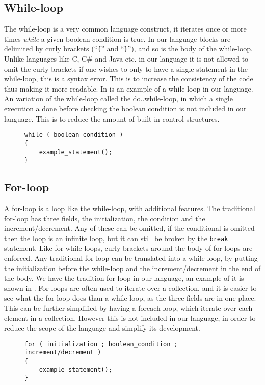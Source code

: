 \subsection{While-loop}
The while-loop is a very common language construct, it iterates once or more times \textit{while} a given boolean condition is true. 
In our language blocks are delimited by curly brackets (``\texttt{\{}'' and ``\texttt{\}}''), and so is the body of the while-loop. 
Unlike languages like C, C\# and Java etc. in our language it is not allowed to omit the curly brackets if one wishes to only to have a single statement in the while-loop, this is a syntax error. 
This is to increase the consistency of the code thus making it more readable. 
In  is an example of a while-loop in our language. 
An variation of the while-loop called the do..while-loop, in which a single execution a done before checking the boolean condition is not included in our language. 
This is to reduce the amount of built-in control structures. 

\begin{figure}[h]
\begin{lstlisting}[caption=An example of a while-loop, label=lst:whileExample]
while ( boolean_condition )
{
    example_statement();
}
\end{lstlisting}
\end{figure}
\subsection{For-loop}
A for-loop is a loop like the while-loop, with additional features. 
The traditional for-loop has three fields, the initialization, the condition and the increment/decrement. 
Any of these can be omitted, if the conditional is omitted then the loop is an infinite loop, but it can still be broken by the \texttt{break} statement.
Like for while-loops, curly brackets around the body of for-loops are enforced. 
Any traditional for-loop can be translated into a while-loop, by putting the initialization before the while-loop and the increment/decrement in the end of the body. 
We have the tradition for-loop in our language, an example of it is shown in . 
For-loops are often used to iterate over a collection, and it is easier to see what the for-loop does than a while-loop, as the three fields are in one place. 
This can be further simplified by having a foreach-loop, which iterate over each element in a collection.
However this is not included in our language, in order to reduce the scope of the language and simplify its development. 
\begin{figure}[h]
\begin{lstlisting}[caption=An example of a for-loop, label=lst:forExample]
for ( initialization ; boolean_condition ; increment/decrement )
{
    example_statement();
}
\end{lstlisting}
\end{figure}


